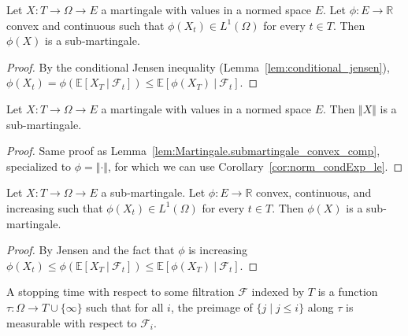 \begin{lemma}\label{lem:Martingale.submartingale_convex_comp}
  \leanok
Let $X : T \rightarrow \Omega\rightarrow E$ a martingale with values in a normed space $E$.
Let $\phi : E \rightarrow \mathbb{R}$ convex and continuous such that
$\phi(X_t)\in L^1(\Omega)$ for every $t\in T$. Then $\phi(X)$ is a sub-martingale.
\end{lemma}

\begin{proof}
  \leanok
  By the conditional Jensen inequality (Lemma~\ref{lem:conditional_jensen}),
  $\phi(X_t) = \phi\left( \mathbb{E}[X_T\ |\ \mathcal{F}_t] \right)\leq \mathbb{E}[\phi(X_T)\ |\ \mathcal{F}_t]$.
\end{proof}


\begin{corollary}\label{cor:Martingale.submartingale_norm}
  \leanok
  Let $X : T \rightarrow \Omega \rightarrow E$ a martingale with values in a normed space $E$.
  Then $\Vert X \Vert$ is a sub-martingale.
\end{corollary}

\begin{proof}
  \leanok
Same proof as Lemma~\ref{lem:Martingale.submartingale_convex_comp}, specialized to $\phi = \Vert \cdot \Vert$, for which we can use Corollary~\ref{cor:norm_condExp_le}.
\end{proof}


\begin{lemma}\label{lem:convex_of_submg_is_submg}
  \leanok
Let $X : T  \rightarrow \Omega \rightarrow E$ a sub-martingale.
Let $\phi:E \rightarrow \mathbb{R}$ convex, continuous, and increasing such that
$\phi(X_t)\in L^1(\Omega)$ for every $t\in T$. Then $\phi(X)$ is a sub-martingale.
\end{lemma}

\begin{proof}
  \leanok
  By Jensen and the fact that $\phi$ is increasing
  $\phi(X_t) \leq \phi\left( \mathbb{E}[X_T\ |\ \mathcal{F}_t] \right)\leq \mathbb{E}[\phi(X_T)\ |\ \mathcal{F}_t]$.
\end{proof}


\begin{definition}\label{def:IsStoppingTime}
  \mathlibok
A stopping time with respect to some filtration $\mathcal{F}$ indexed by $T$ is a function $\tau : \Omega \to T \cup \{\infty\}$ such that for all $i$, the preimage of $\{j \mid j \le i\}$ along $\tau$ is measurable with respect to $\mathcal{F}_i$.
\end{definition}


